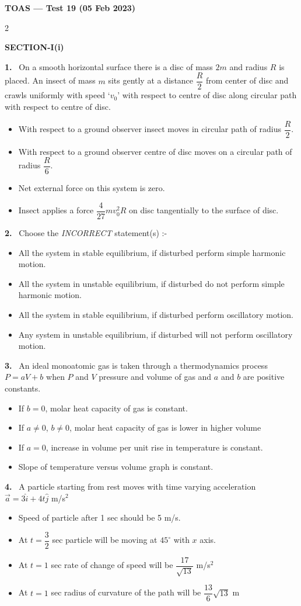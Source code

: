 \documentclass[10pt]{extarticle}
\newcommand{\papersec}[1]{\par\bigskip{\centering\Large\bfseries PAPER-#1\par}\medskip}
\newcommand{\partsec}[2]{\par\medskip\noindent{\large\bfseries PART-#1: #2}\par\smallskip}
\newcommand{\sect}[1]{\par\smallskip\noindent\textbf{#1}\par}
\newcommand{\qn}[1]{\par\smallskip\noindent\textbf{#1.}~}
\newenvironment{qoptions}{\begin{itemize}[leftmargin=1.8em,itemsep=1pt,topsep=2pt,label={}]}{\end{itemize}}
\newcommand{\opt}[2]{\item[(#1)] #2}
\begin{document}
\begin{center}{\Large\bfseries TOAS --- Test 19 (05 Feb 2023)}\end{center}
\begin{multicols}{2}
\raggedcolumns
\papersec{1}
\partsec{1}{PHYSICS}
\sect{SECTION-I(i)}
\qn{1} On a smooth horizontal surface there is a disc of mass $2m$ and radius $R$ is placed. An insect of mass $m$ sits gently at a distance $\dfrac R2$ from center of disc and crawls uniformly with speed `$v_0$' with respect to centre of disc along circular path with respect to centre of disc.
\begin{qoptions}
\opt{A}{With respect to a ground observer insect moves in circular path of radius $\dfrac R2$.}
\opt{B}{With respect to a ground observer centre of disc moves on a circular path of radius $\dfrac R6$.}
\opt{C}{Net external force on this system is zero.}
\opt{D}{Insect applies a force $\dfrac4{27}mv_0^2R$ on disc tangentially to the surface of disc.}
\end{qoptions}
\qn{2} Choose the \textit{INCORRECT} statement(s) :-
\begin{qoptions}
\opt{A}{All the system in stable equilibrium, if disturbed perform simple harmonic motion.}
\opt{B}{All the system in unstable equilibrium, if disturbed do not perform simple harmonic motion.}
\opt{C}{All the system in stable equilibrium, if disturbed perform oscillatory motion.}
\opt{D}{Any system in unstable equilibrium, if disturbed will not perform oscillatory motion.}
\end{qoptions}
\qn{3} An ideal monoatomic gas is taken through a thermodynamics process $P=aV+b$ when $P$ and $V$ pressure and volume of gas and $a$ and $b$ are positive constants.
\begin{qoptions}
\opt{A}{If $b=0$, molar heat capacity of gas is constant.}
\opt{B}{If $a\neq0$, $b\neq0$, molar heat capacity of gas is lower in higher volume}
\opt{C}{If $a=0$, increase in volume per unit rise in temperature is constant.}
\opt{D}{Slope of temperature versus volume graph is constant.}
\end{qoptions}
\qn{4} A particle starting from rest moves with time varying acceleration $\vec a=3\hat i+4t\hat j$ m/s$^2$
\begin{qoptions}
\opt{A}{Speed of particle after 1 sec should be 5 m/s.}
\opt{B}{At $t=\dfrac32$ sec particle will be moving at $45^\circ$ with $x$ axis.}
\opt{C}{At $t=1$ sec rate of change of speed will be $\dfrac{17}{\sqrt{13}}$ m/s$^2$}
\opt{D}{At $t=1$ sec radius of curvature of the path will be $\dfrac{13}6\sqrt{13}$ m}

\end{qoptions}
\end{multicols}
\end{document}
